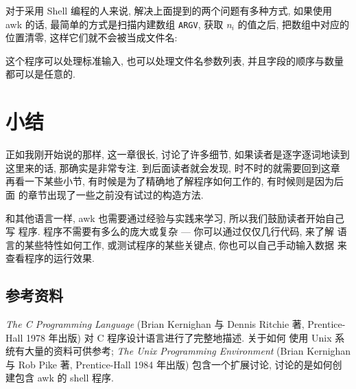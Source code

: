 对于采用 Shell 编程的人来说, 解决上面提到的两个问题有多种方式, 如果使用 
awk 的话, 最简单的方式是扫描内建数组 \verb'ARGV', 获取 \textit{n}$_i$
的值之后, 把数组中对应的位置清零, 这样它们就不会被当成文件名:
这个程序可以处理标准输入, 也可以处理文件名参数列表, 并且字段的顺序与数量
都可以是任意的.

\section{小结}
\label{sec:the_awk_language_summary}

正如我刚开始说的那样, 这一章很长, 讨论了许多细节, 如果读者是逐字逐词地读到
这里来的话, 那确实是非常专注. 到后面读者就会发现, 时不时的就需要回到这章
再看一下某些小节, 有时候是为了精确地了解程序如何工作的, 有时候则是因为后面
的章节出现了一些之前没有试过的构造方法.

和其他语言一样, awk 也需要通过经验与实践来学习, 所以我们鼓励读者开始自己写
程序. 程序不需要有多么的庞大或复杂 --- 你可以通过仅仅几行代码, 来了解
语言的某些特性如何工作, 或测试程序的某些关键点, 你也可以自己手动输入数据
来查看程序的运行效果.

\subsection*{参考资料}
\label{subsec:bibliographic_notes}

\textit{The C Programming Language} (Brian Kernighan 与 Dennis Ritchie 著,
Prentice-Hall 1978 年出版) 对 C 程序设计语言进行了完整地描述. 关于如何 
使用 Unix 系统有大量的资料可供参考; \textit{The Unix Programming 
Environment} (Brian Kernighan 与 Rob Pike 著, Prentice-Hall 1984 年出版)
包含一个扩展讨论, 讨论的是如何创建包含 awk 的 shell 程序.
